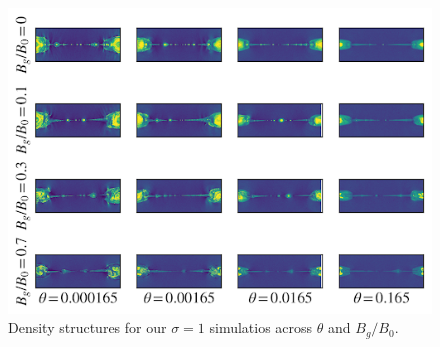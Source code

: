 \documentclass[iop,twocolappendix]{emulateapj}
\begin{document}
\begin{figure}[!h]
	\includegraphics[width=\linewidth]{sig1_params.png}
	\caption{Density structures for our $\sigma=1$ simulatios across $\theta$ and $B_{g}/B_{0}$.
	}
	\label{sig1_matrix}
\end{figure}
\end{document}
